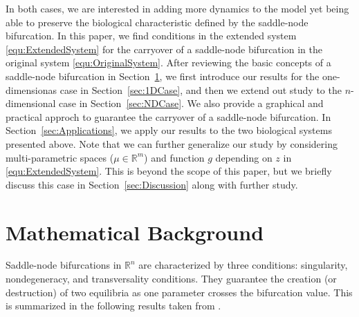 \documentclass[12pt]{article}
\begin{document}

In both cases, we are interested in adding more dynamics to the model yet being able to preserve the biological characteristic defined by the saddle-node bifurcation. In this paper, we find conditions in the extended system \eqref{equ:ExtendedSystem} for the carryover of a saddle-node bifurcation in the original system 
\eqref{equ:OriginalSystem}. After reviewing the basic concepts of a saddle-node bifurcation in Section~\ref{sec:Background}, we first introduce our results for the one-dimensionas case in Section~\ref{sec:1DCase}, and then we extend out study to the $n$-dimensional case in Section~\ref{sec:NDCase}. We also provide a graphical and practical approch to guarantee the carryover of a saddle-node bifurcation. In Section~\ref{sec:Applications}, we apply our results to the two biological systems presented above. Note that we can further generalize our study by considering multi-parametric spaces ($\mu \in \mathbb{R}^{m}$) and function $g$ depending on $z$ in \eqref{equ:ExtendedSystem}. This is beyond the scope of this paper, but we briefly discuss this case in Section~\ref{sec:Discussion} along with further study.


\section{Mathematical Background}
\label{sec:Background}

Saddle-node bifurcations in $\mathbb{R}^{n}$ are characterized by three conditions: singularity, nondegeneracy, and transversality conditions. They guarantee the creation (or destruction) of two equilibria as one parameter crosses the bifurcation value. This is summarized in the following results taken from \citet[Ch. 8]{Meiss2007}.
\end{document}
